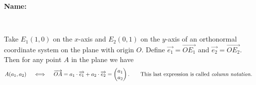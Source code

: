 \documentclass[9pt]{exam}
\begin{document}
\textbf{Name:} \dotfill

\

Take $E_1(1, 0)$ on the $x$-axis and $E_2(0, 1)$ on the $y$-axis of an orthonormal coordinate system on the plane with origin $O$. Define $\overrightarrow{e_1} = \overrightarrow{OE_1}$ and $\overrightarrow{e_2} = \overrightarrow{OE_2}$. Then for any point $A$ in the plane we have
$$ A(a_1, a_2) \quad \iff \quad \overrightarrow{OA} = a_1 \cdot \overrightarrow{e_1} + a_2 \cdot \overrightarrow{e_2} = \left( \begin{matrix} a_1 \\ a_2 \end{matrix} \right). \qquad \mbox{This last expression is called \emph{column notation}}.$$

\vspace{-8mm}

\begin{center}
\end{center}
\end{document}

